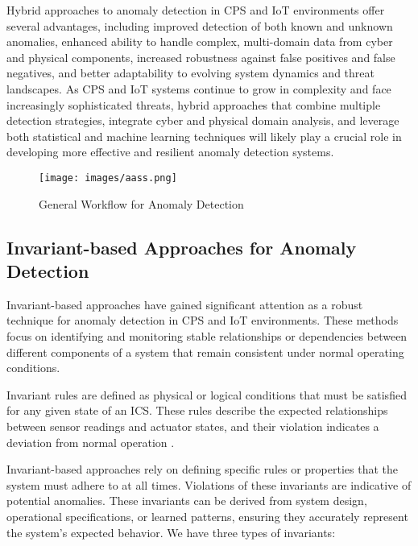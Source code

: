Hybrid approaches to anomaly detection in CPS and IoT environments offer several advantages, including improved detection of both known and unknown anomalies, enhanced ability to handle complex, multi-domain data from cyber and physical components, increased robustness against false positives and false negatives, and better adaptability to evolving system dynamics and threat landscapes. As CPS and IoT systems continue to grow in complexity and face increasingly sophisticated threats, hybrid approaches that combine multiple detection strategies, integrate cyber and physical domain analysis, and leverage both statistical and machine learning techniques will likely play a crucial role in developing more effective and resilient anomaly detection systems.




\begin{figure*}
    \centering
    \texttt{[image: images/aass.png]}
    \caption{General Workflow for Anomaly Detection}
    \label{fig:general-steps}
\end{figure*}


\subsection{Invariant-based Approaches for Anomaly Detection}

Invariant-based approaches have gained significant attention as a robust technique for anomaly detection in CPS and IoT environments. These methods focus on identifying and monitoring stable relationships or dependencies between different components of a system that remain consistent under normal operating conditions.

\begin{definition}
Invariant rules are defined as physical or logical conditions that must be satisfied for any given state of an ICS. These rules describe the expected relationships between sensor readings and actuator states, and their violation indicates a deviation from normal operation \cite{21,23}.
\end{definition}

Invariant-based approaches rely on defining specific rules or properties that the system must adhere to at all times. Violations of these invariants are indicative of potential anomalies. These invariants can be derived from system design, operational specifications, or learned patterns, ensuring they accurately represent the system's expected behavior. We have three types of invariants:

